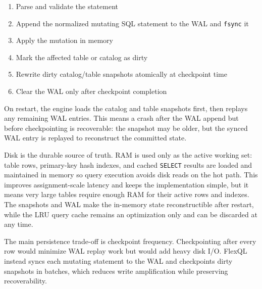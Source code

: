 \documentclass[11pt,a4paper]{article}
\begin{document}
\begin{enumerate}
    \item Parse and validate the statement
    \item Append the normalized mutating SQL statement to the WAL and \texttt{fsync} it
    \item Apply the mutation in memory
    \item Mark the affected table or catalog as dirty
    \item Rewrite dirty catalog/table snapshots atomically at checkpoint time
    \item Clear the WAL only after checkpoint completion
\end{enumerate}

On restart, the engine loads the catalog and table snapshots first, then replays any remaining WAL entries. This means a crash after the WAL append but before checkpointing is recoverable: the snapshot may be older, but the synced WAL entry is replayed to reconstruct the committed state.

\begin{center}
\end{center}

Disk is the durable source of truth. RAM is used only as the active working set: table rows, primary-key hash indexes, and cached \texttt{SELECT} results are loaded and maintained in memory so query execution avoids disk reads on the hot path. This improves assignment-scale latency and keeps the implementation simple, but it means very large tables require enough RAM for their active rows and indexes. The snapshots and WAL make the in-memory state reconstructible after restart, while the LRU query cache remains an optimization only and can be discarded at any time.

The main persistence trade-off is checkpoint frequency. Checkpointing after every row would minimize WAL replay work but would add heavy disk I/O. FlexQL instead syncs each mutating statement to the WAL and checkpoints dirty snapshots in batches, which reduces write amplification while preserving recoverability.
\end{document}

